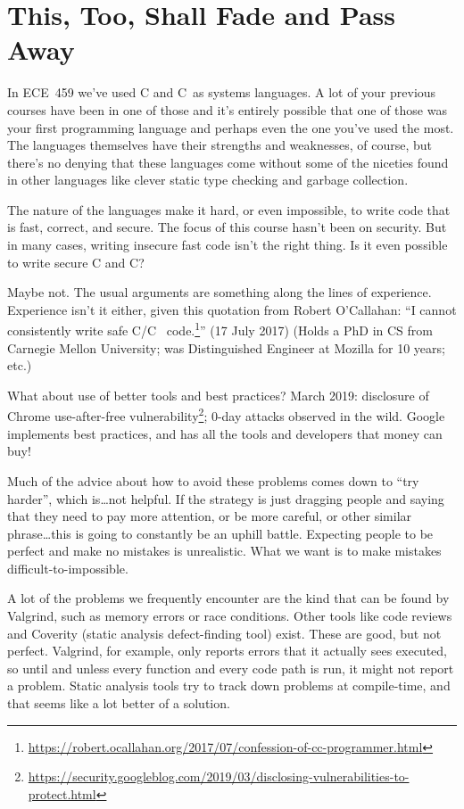 \documentclass[a4paper]{report}
\newcommand{\CPP}{C\nolinebreak\hspace{-.05em}\raisebox{.4ex}{\tiny\bf +}\nolinebreak\hspace{-.10em}\raisebox{.4ex}{\tiny\bf +}}
\def\CPP{{C\nolinebreak[4]\hspace{-.05em}\raisebox{.4ex}{\tiny\bf ++}}}
\begin{document}

\section*{This, Too, Shall Fade and Pass Away}
In ECE~459 we've used C and \CPP~as systems languages. A lot of your previous courses have been in one of those and it's entirely possible that one of those was your first programming language and perhaps even the one you've used the most. The languages themselves have their strengths and weaknesses, of course, but there's no denying that these languages come without some of the niceties found in other languages like clever static type checking and garbage collection.


The nature of the languages make it hard, or even impossible, to write code that is fast, correct, and secure. The focus of this course hasn't been on security. But in many cases, writing insecure fast code isn't the right thing. Is it even possible to write secure C and \CPP?

Maybe not. The usual arguments are something along the lines of experience. Experience isn't it either, given this quotation from Robert O'Callahan: ``I cannot consistently write safe C/\CPP~ code.\footnote{\url{https://robert.ocallahan.org/2017/07/confession-of-cc-programmer.html}}'' (17 July 2017) (Holds a PhD in CS from Carnegie Mellon University; was Distinguished Engineer at Mozilla for 10 years; etc.)

What about use of better tools and best practices? March 2019: disclosure of Chrome use-after-free vulnerability\footnote{\url{https://security.googleblog.com/2019/03/disclosing-vulnerabilities-to-protect.html}}; 0-day attacks
observed in the wild. Google implements best practices, and has all the tools and developers that
money can buy!

Much of the advice about how to avoid these problems comes down to ``try harder'', which is\ldots not helpful. If the strategy is just dragging people and saying that they need to pay more attention, or be more careful, or other similar phrase\ldots this is going to constantly be an uphill battle. Expecting people to be perfect and make no mistakes is unrealistic. What we want is to make mistakes difficult-to-impossible.

A lot of the problems we frequently encounter are the kind that can be found by Valgrind, such as memory errors or race conditions. Other tools like code reviews and Coverity (static analysis defect-finding tool) exist. These are good, but not perfect. Valgrind, for example, only reports errors that it actually sees executed, so until and unless every function and every code path is run, it might not report a problem. Static analysis tools try to track down problems at compile-time, and that seems like a lot better of a solution.
\end{document}
